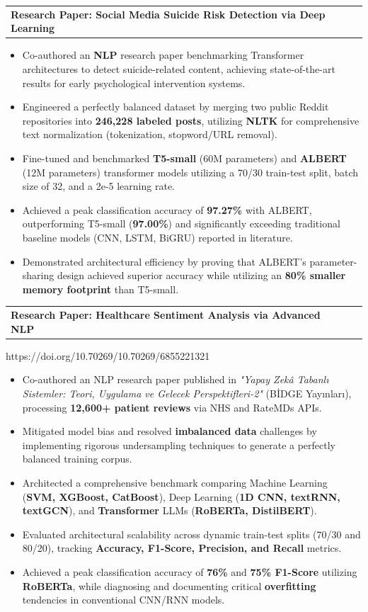 \documentclass[letterpaper,11pt]{article}
\newcommand{\resumeItem}[1]{
  \item\small{
    {#1 \vspace{-4pt}}
  }
}
\newcommand{\resumeProjectHeading}[2]{
    \item
    \begin{tabularx}{0.97\textwidth}{X r}
      \textbf{#1} & #2 \\
    \end{tabularx}\vspace{-5pt}
}
\newcommand{\resumeItemListStart}{\begin{itemize}}
\newcommand{\resumeItemListEnd}{\end{itemize}\vspace{-5pt}}
\begin{document}
          \resumeProjectHeading
          {\textbf{Research Paper: Social Media Suicide Risk Detection via Deep Learning} }{}
          \resumeItemListStart
            \resumeItem{Co-authored an \textbf{NLP} research paper benchmarking Transformer architectures to detect suicide-related content, achieving state-of-the-art results for early psychological intervention systems.}
            \resumeItem{Engineered a perfectly balanced dataset by merging two public Reddit repositories into \textbf{246,228 labeled posts}, utilizing \textbf{NLTK} for comprehensive text normalization (tokenization, stopword/URL removal).}
            \resumeItem{Fine-tuned and benchmarked \textbf{T5-small} (60M parameters) and \textbf{ALBERT} (12M parameters) transformer models utilizing a 70/30 train-test split, batch size of 32, and a 2e-5 learning rate.}
            \resumeItem{Achieved a peak classification accuracy of \textbf{97.27\%} with ALBERT, outperforming T5-small (\textbf{97.00\%}) and significantly exceeding traditional baseline models (CNN, LSTM, BiGRU) reported in literature.}
            \resumeItem{Demonstrated architectural efficiency by proving that ALBERT's parameter-sharing design achieved superior accuracy while utilizing an \textbf{80\% smaller memory footprint} than T5-small.}
          \resumeItemListEnd

          \resumeProjectHeading
          {\textbf{Research Paper: Healthcare Sentiment Analysis via Advanced NLP} \vspace{5px} } \ \vspace{-5px}
          {https://doi.org/10.70269/10.70269/6855221321}
          \resumeItemListStart
            \resumeItem{Co-authored an NLP research paper published in \textit{"Yapay Zekâ Tabanlı Sistemler: Teori, Uygulama ve Gelecek Perspektifleri-2"} (BİDGE Yayınları), processing \textbf{12,600+ patient reviews} via NHS and RateMDs APIs.}
            \resumeItem{Mitigated model bias and resolved \textbf{imbalanced data} challenges by implementing rigorous undersampling techniques to generate a perfectly balanced training corpus.}
            \resumeItem{Architected a comprehensive benchmark comparing Machine Learning (\textbf{SVM, XGBoost, CatBoost}), Deep Learning (\textbf{1D CNN, textRNN, textGCN}), and \textbf{Transformer} LLMs (\textbf{RoBERTa, DistilBERT}).}
            \resumeItem{Evaluated architectural scalability across dynamic train-test splits (70/30 and 80/20), tracking \textbf{Accuracy, F1-Score, Precision, and Recall} metrics.}
            \resumeItem{Achieved a peak classification accuracy of \textbf{76\%} and \textbf{75\% F1-Score} utilizing \textbf{RoBERTa}, while diagnosing and documenting critical \textbf{overfitting} tendencies in conventional CNN/RNN models.}
          \resumeItemListEnd
\end{document}
